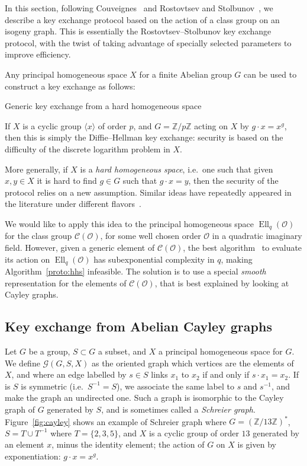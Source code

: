 \documentclass{article}
\newcommand{\Cl}{\mathcal{C}}
\newcommand{\Graph}{\mathcal{G}}
\renewcommand{\O}{\mathcal{O}}
\theoremstyle{definition}
\DeclareMathOperator{\Ell}{Ell}
\begin{document}
In this section, following Couveignes~\cite{cryptoeprint:2006:291} and
Rostovtsev and Stolbunov~\cite{rostovtsev+stolbunov06}, we describe a
key exchange protocol based on the action of a class group on an
isogeny graph.  This is essentially the Rostovtsev--Stolbunov key
exchange protocol, with the twist of taking advantage of specially
selected parameters to improve efficiency.

Any principal homogeneous space $X$ for a finite Abelian group $G$ can
be used to construct a key exchange as follows:

\begin{algorithm}
  \caption{Generic key exchange from a hard homogeneous space}
  \label{proto:hhs}
\end{algorithm}

If $X$ is a cyclic group $〈x〉$ of order $p$, and $G=ℤ/pℤ$ acting on
$X$ by $g·x=x^g$, then this is simply the Diffie--Hellman key exchange:
security is based on the difficulty of the discrete logarithm problem
in $X$.

More generally, if $X$ is a \emph{hard homogeneous space}, i.e.\ one
such that given $x,y∈X$ it is hard to find $g∈G$ such that $g·x=y$,
then the security of the protocol relies on a new assumption. Similar
ideas have repeatedly appeared in the literature under different
flavors~\cite{10.1007/3-540-44598-6_10,monico2007}.

We would like to apply this idea to the principal homogeneous space
$\Ell_q(\O)$ for the class group $\Cl(\O)$, for some well chosen order
$\O$ in a quadratic imaginary field. However, given a generic element
of $\Cl(\O)$, the best algorithm~\cite{jao+soukharev10} to evaluate
its action on $\Ell_q(\O)$ has subexponential complexity in $q$,
making Algorithm~\ref{proto:hhs} infeasible. The solution is to use a
special \emph{smooth} representation for the elements of $\Cl(\O)$,
that is best explained by looking at Cayley graphs.


\subsection{Key exchange from Abelian Cayley graphs}

Let $G$ be a group, $S⊂G$ a subset, and $X$ a principal homogeneous
space for $G$. We define $\Graph(G, S, X)$ as the oriented graph which
vertices are the elements of $X$, and where an edge labelled by $s∈S$
links $x_1$ to $x_2$ if and only if $s\cdot x_1 = x_2$.  If is $S$ is
symmetric (i.e.\ $S^{-1}=S$), we associate the same label to $s$ and
$s^{-1}$, and make the graph an undirected one. Such a graph is
isomorphic to the Cayley graph of $G$ generated by $S$, and is
sometimes called a \emph{Schreier graph}.  Figure~\ref{fig:cayley}
shows an example of Schreier graph where $G=(ℤ/13ℤ)^*$, $S=T∪T^{-1}$
where $T=\{2,3,5\}$, and $X$ is a cyclic group of order $13$ generated
by an element $x$, minus the identity element; the action of $G$ on
$X$ is given by exponentiation: $g·x=x^g$.
\end{document}

